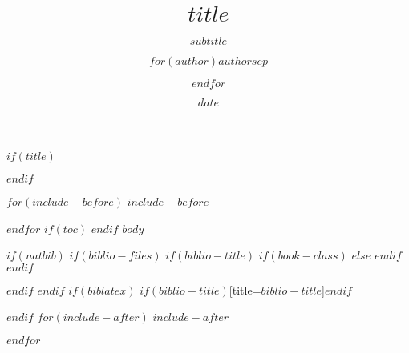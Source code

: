 \documentclass{article}
\title{$title$}
\subtitle{$subtitle$}
\author{$for(author)$$author$$sep$ \and $endfor$}
\date{$date$}
\begin{document}
$if(title)$
\maketitle
$endif$

$for(include-before)$
$include-before$

$endfor$
$if(toc)$
{
\hypersetup{linkcolor=black}
\setcounter{tocdepth}{$toc-depth$}
\tableofcontents
}
$endif$
$body$

$if(natbib)$
$if(biblio-files)$
$if(biblio-title)$
$if(book-class)$
\renewcommand\bibname{$biblio-title$}
$else$
\renewcommand\refname{$biblio-title$}
$endif$
$endif$


$endif$
$endif$
$if(biblatex)$
\printbibliography$if(biblio-title)$[title=$biblio-title$]$endif$

$endif$
$for(include-after)$
$include-after$

$endfor$
\end{document}
